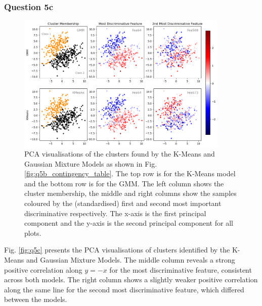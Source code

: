\subsubsection{Question 5c}\label{subsubsec:q5c}
    \begin{figure}[htb]
    \centering
    \includegraphics[width=0.9\textwidth]{./figures/q5c}
    \caption{PCA visualisations of the clusters found by the K-Means and Gaussian Mixture Models as shown in Fig.
        \eqref{fig:q5b_contingency_table}. The top row is for the K-Means model and the bottom row is for the GMM.
        The left column shows the cluster membership, the middle and right columns show the samples coloured by the
        (standardised) first and second most important discriminative respectively. The x-axis is the first principal
        component and the y-axis is the second principal component for all plots.}
    \label{fig:q5c}
    \end{figure}

    Fig. \eqref{fig:q5c} presents the PCA visualisations of clusters identified by the K-Means and Gaussian Mixture Models.
    The middle column reveals a strong positive correlation along $y=-x$ for the most discriminative feature, consistent across
    both models.
    The right column shows a slightly weaker positive correlation along the same line for the second most
    discriminative feature, which differed between the models.

